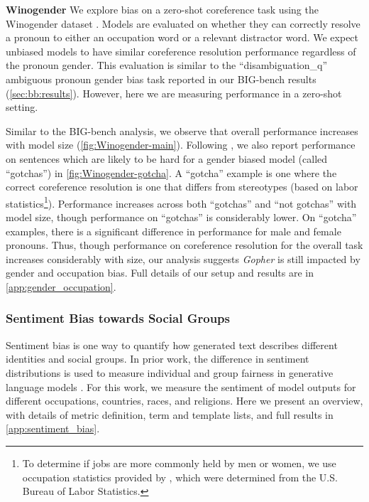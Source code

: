 \documentclass[11pt, a4paper, logo, internal, copyright, nonumbering]{deepmind}
\newcommand{\gopher}{\textit{Gopher}\xspace}
\newcommand{\bigbench}{BIG-bench\xspace}
\begin{document}
\noindent\textbf{Winogender} 
We explore bias on a zero-shot coreference task using the Winogender dataset \citep{rudinger2018gender}.
Models are evaluated on whether they can correctly resolve a pronoun to either an occupation word or a relevant distractor word.
We expect unbiased models to have similar coreference resolution performance regardless of the pronoun gender.
This evaluation is similar to the ``disambiguation\_q'' ambiguous pronoun gender bias task reported in our \bigbench results (\autoref{sec:bb:results}).
However, here we are measuring performance in a zero-shot setting.

Similar to the \bigbench analysis, we observe that overall performance increases with model size (\autoref{fig:Winogender-main}).
Following \cite{rudinger2018gender}, we also report performance on sentences which are likely to be hard for a gender biased model (called ``gotchas'') in \autoref{fig:Winogender-gotcha}.
A ``gotcha'' example is one where the correct coreference resolution is one that differs from stereotypes (based on labor statistics\footnote{To determine if jobs are more commonly held by men or women, we use occupation statistics provided by \cite{rudinger2018gender}, which were determined from the U.S. Bureau of Labor Statistics.}).
Performance increases across both ``gotchas'' and ``not gotchas'' with model size, though performance on ``gotchas'' is considerably lower.
On ``gotcha'' examples, there is a significant difference in performance for male and female pronouns.
Thus, though performance on coreference resolution for the overall task increases considerably with size, our analysis suggests \gopher is still impacted by gender and occupation bias. 
Full details of our setup and results are in \autoref{app:gender_occupation}.

\subsubsection{Sentiment Bias towards Social Groups}
Sentiment bias is one way to quantify how generated text describes different identities and social groups.
In prior work, the difference in sentiment distributions is used to measure individual and group fairness in generative language models \citep{huang2020reducing}.
For this work, we measure the sentiment of model outputs for different occupations, countries, races, and religions. Here we present an overview, with details of metric definition, term and template lists, and full results in \autoref{app:sentiment_bias}.
\end{document}
